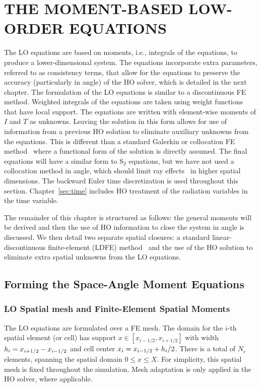 
\chapter{\uppercase{The Moment-Based Low-Order Equations}}
\label{chp:lo}

The LO equations are based on moments, i.e., integrals of the equations, to produce a
lower-dimensional system.  The equations incorporate extra parameters, referred to as
consistency terms, that allow for the equations to preserve the accuracy (particularly in
angle) of the HO solver, which is detailed in the next chapter. 
The formulation of the LO equations is similar to a discontinuous FE method.  Weighted
integrals of the equations are taken using weight functions that have local support. 
The equations are written with element-wise moments of $I$ and $T$ as
unknowns.  Leaving the solution in this form allows for use of information from a
previous HO solution to eliminate auxiliary unknowns from the equations. This is different
than a standard Galerkin or collocation FE
method~\cite{morel_ldtrt,morel_notes} where a
functional form of the solution is directly assumed. The final equations will have a
similar form to S$_2$ equations, but we have not used a collocation method in angle,
which should limit ray effects~\cite{morel_notes,lewis} in higher spatial dimensions.
The backward Euler time discretization is used throughout this section.
Chapter~\ref{sec:time} includes HO treatment of the radiation variables in the time
variable.

The remainder of this chapter is structured as follows: the general moments will be
derived and then the use of HO information to close the system in angle is discussed.
We then detail two separate spatial closures: a standard linear-discontinuous finite-element (LDFE)
method~\cite{morel_ldtrt} and the use of the HO solution to eliminate extra
spatial unknowns from the LO equations.  

\section{Forming the Space-Angle Moment Equations}

\subsection{LO Spatial mesh and Finite-Element Spatial Moments}

The LO equations are formulated over a FE mesh.  The domain for the $i$-th spatial
element (or cell) has support $x\in[x_{i-1/2},x_{i+1/2}]$ with width $h_i=x_{i+1/2} -
x_{{i-1/2}}$ and cell center 
$x_i = x_{{i-1/2}} + h_i/2$.  There is a total of $N_c$ elements, spanning the
spatial domain $0\leq x\leq X$.  For simplicity, this spatial mesh is fixed throughout the
simulation.  Mesh adaptation is only applied in the HO solver, where applicable.

